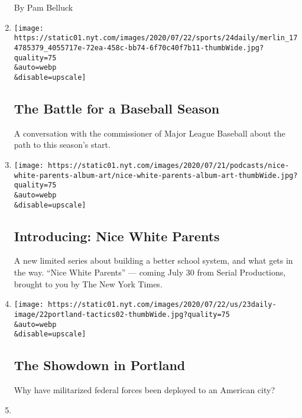 \begin{enumerate}
  By Pam Belluck
\item
  \href{/2020/07/24/podcasts/the-daily/mlb-baseball-season-coronavirus.html}{}

  \texttt{[image: https://static01.nyt.com/images/2020/07/22/sports/24daily/merlin\_174785379\_4055717e-72ea-458c-bb74-6f70c40f7b11-thumbWide.jpg?quality=75\\\&auto=webp\\\&disable=upscale]}

  \hypertarget{the-battle-for-a-baseball-season}{%
  \subsection{The Battle for a Baseball
  Season}\label{the-battle-for-a-baseball-season}}

  A conversation with the commissioner of Major League Baseball about
  the path to this season's start.
\item
  \href{/2020/07/23/podcasts/nice-white-parents-serial.html}{}

  \texttt{[image: https://static01.nyt.com/images/2020/07/21/podcasts/nice-white-parents-album-art/nice-white-parents-album-art-thumbWide.jpg?quality=75\\\&auto=webp\\\&disable=upscale]}

  \hypertarget{introducing-nice-white-parents}{%
  \subsection{Introducing: Nice White
  Parents}\label{introducing-nice-white-parents}}

  A new limited series about building a better school system, and what
  gets in the way. ``Nice White Parents'' --- coming July 30 from Serial
  Productions, brought to you by The New York Times.
\item
  \href{/2020/07/23/podcasts/the-daily/portland-protests.html}{}

  \texttt{[image: https://static01.nyt.com/images/2020/07/22/us/23daily-image/22portland-tactics02-thumbWide.jpg?quality=75\\\&auto=webp\\\&disable=upscale]}

  \hypertarget{the-showdown-in-portland}{%
  \subsection{The Showdown in Portland}\label{the-showdown-in-portland}}

  Why have militarized federal forces been deployed to an American city?
\item
  \href{/2020/07/22/podcasts/the-daily/school-reopenings-coronavirus.html}{}


\end{enumerate}
